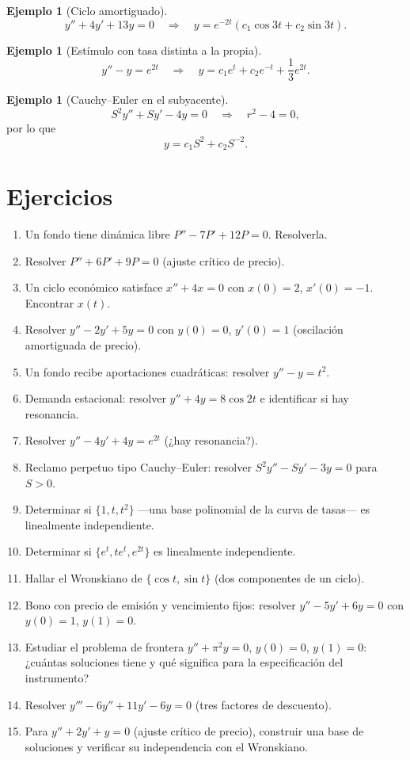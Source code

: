 \documentclass[11pt]{article}
\theoremstyle{definition}
\newtheorem{ejemplo}[teorema]{Ejemplo}
\begin{document}
\begin{ejemplo}[Ciclo amortiguado]
\[
y''+4y'+13y=0
\quad\Longrightarrow\quad
\boxed{y=e^{-2t}(c_1\cos3t+c_2\sin3t)}.
\]
\end{ejemplo}

\begin{ejemplo}[Estímulo con tasa distinta a la propia]
\[
y''-y=e^{2t}
\quad\Longrightarrow\quad
\boxed{y=c_1e^t+c_2e^{-t}+\frac13e^{2t}}.
\]
\end{ejemplo}

\begin{ejemplo}[Cauchy--Euler en el subyacente]
\[
S^2y''+Sy'-4y=0
\quad\Longrightarrow\quad
r^2-4=0,
\]
por lo que
\[
\boxed{y=c_1S^2+c_2S^{-2}}.
\]
\end{ejemplo}

\section{Ejercicios}
\begin{enumerate}
\item Un fondo tiene dinámica libre $P''-7P'+12P=0$. Resolverla.
\item Resolver $P''+6P'+9P=0$ (ajuste crítico de precio).
\item Un ciclo económico satisface $x''+4x=0$ con $x(0)=2$, $x'(0)=-1$. Encontrar $x(t)$.
\item Resolver $y''-2y'+5y=0$ con $y(0)=0$, $y'(0)=1$ (oscilación amortiguada de precio).
\item Un fondo recibe aportaciones cuadráticas: resolver $y''-y=t^2$.
\item Demanda estacional: resolver $y''+4y=8\cos2t$ e identificar si hay resonancia.
\item Resolver $y''-4y'+4y=e^{2t}$ (¿hay resonancia?).
\item Reclamo perpetuo tipo Cauchy--Euler: resolver $S^2y''-Sy'-3y=0$ para $S>0$.
\item Determinar si $\{1,t,t^2\}$ —una base polinomial de la curva de tasas— es
linealmente independiente.
\item Determinar si $\{e^t,te^t,e^{2t}\}$ es linealmente independiente.
\item Hallar el Wronskiano de $\{\cos t,\sin t\}$ (dos componentes de un ciclo).
\item Bono con precio de emisión y vencimiento fijos: resolver $y''-5y'+6y=0$ con
$y(0)=1$, $y(1)=0$.
\item Estudiar el problema de frontera $y''+\pi^2y=0$, $y(0)=0$, $y(1)=0$: ¿cuántas
soluciones tiene y qué significa para la especificación del instrumento?
\item Resolver $y'''-6y''+11y'-6y=0$ (tres factores de descuento).
\item Para $y''+2y'+y=0$ (ajuste crítico de precio), construir una base de soluciones
y verificar su independencia con el Wronskiano.
\end{enumerate}
\end{document}
